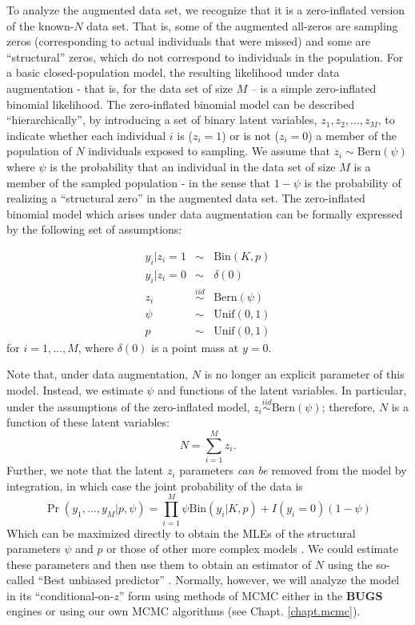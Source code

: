 To analyze the augmented data set, we recognize that it is a
zero-inflated version of the known-$N$ data set. That is, some of the
augmented all-zeros are sampling zeros (corresponding to actual
individuals that were missed) and some are ``structural'' zeros, which
do not correspond to individuals in the population. For a basic
closed-population model, the resulting likelihood under data
augmentation - that is, for the data set of size $M$ -- is a simple
zero-inflated binomial likelihood.  The zero-inflated binomial model
can be described ``hierarchically'', by introducing a set of binary
latent variables, $z_{1},z_{2},\ldots, z_{M}$, to indicate whether
each individual $i$ is ($z_i=1$) or is not ($z_i=0$) a member of the
population of $N$ individuals exposed to sampling. We assume that
$z_{i} \sim \mbox{Bern}(\psi)$ where $\psi$ is the probability that an
individual in the data set of size $M$ is a member of the sampled
population - in the sense that $1-\psi$ is the probability of
realizing a ``structural zero'' in the augmented data set.  The
zero-inflated binomial model which arises under data augmentation can
be formally expressed by the following set of assumptions:

\begin{eqnarray*}
 y_{i}|{z_{i}=1} & \sim  &\mbox{Bin}(K, p) \\
 y_{i}|{z_{i}=0} & \sim &  \delta(0)  \\
 z_{i} & \stackrel{iid}{\sim} & \mbox{Bern}(\psi) \\
 \psi & \sim & \mathrm{Unif}(0,1) \\
 p & \sim & \mathrm{Unif}(0,1)
\end{eqnarray*}
for $i=1, \ldots, M$, where $\delta(0)$ is a point mass at $y=0$.

Note that, under data augmentation, 
$N$ is no longer an explicit parameter of this
model. Instead, we estimate $\psi$ and functions of the latent
variables. In particular, under the assumptions of the zero-inflated
model, $z_{i} \stackrel{iid}{\sim} \mbox{Bern}(\psi)$; therefore, $N$
is a function of these latent variables:
 \[
 N = \sum_{i=1}^{M} z_{i}.
\]
Further, we note that the latent $z_i$ parameters {\it can be} removed
 from
the model by integration, in which case the joint probability of the
data is
\begin{equation}
  \Pr(y_1, \ldots, y_M | p, \psi) = \prod_{i=1}^M  \psi \mathrm{Bin}(y_i | K, p) +  I(y_i=0) (1-\psi)
\end{equation}
Which can be maximized directly to obtain the MLEs of the structural
parameters $\psi$ and $p$ or those of other more complex models
\citep[e.g., see][]{royle:2006}. We could estimate these parameters
and then use them to obtain an estimator of $N$ using the so-called
``Best unbiased predictor'' \citep[see][]{royle_dorazio:2011}. Normally, however,
we will analyze the model in its ``conditional-on-$z$'' form using methods of MCMC either
in the {\bf BUGS} engines or using our own MCMC algorithms (see Chapt. \ref{chapt.mcmc}).

